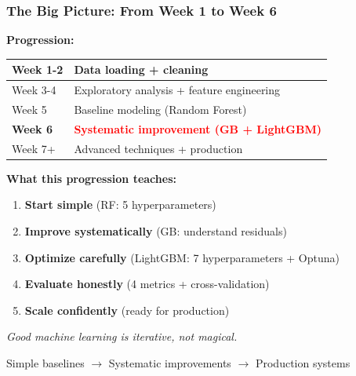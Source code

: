 \documentclass{beamer}
\begin{document}
\begin{frame}[fragile]
\frametitle{The Big Picture: From Week 1 to Week 6}

\vspace{-0.2cm}
\textbf{Progression:}

\begin{center}
{\small
\begin{tabular}{|l|l|}
\hline
Week 1-2 & Data loading + cleaning \\
\hline
Week 3-4 & Exploratory analysis + feature engineering \\
\hline
Week 5 & Baseline modeling (Random Forest) \\
\hline
\textbf{Week 6} & \textbf{\textcolor{red}{Systematic improvement (GB + LightGBM)}} \\
\hline
Week 7+ & Advanced techniques + production \\
\hline
\end{tabular}
}
\end{center}

\vspace{0.3cm}
\textbf{What this progression teaches:}

\begin{enumerate}
    \item \textbf{Start simple} (RF: 5 hyperparameters)
    \item \textbf{Improve systematically} (GB: understand residuals)
    \item \textbf{Optimize carefully} (LightGBM: 7 hyperparameters + Optuna)
    \item \textbf{Evaluate honestly} (4 metrics + cross-validation)
    \item \textbf{Scale confidently} (ready for production)
\end{enumerate}

\vspace{0.3cm}
\begin{center}
\large
\textit{Good machine learning is iterative, not magical.}

\vspace{0.2cm}
Simple baselines $\rightarrow$ Systematic improvements $\rightarrow$ Production systems
\end{center}

\end{frame}
\end{document}
